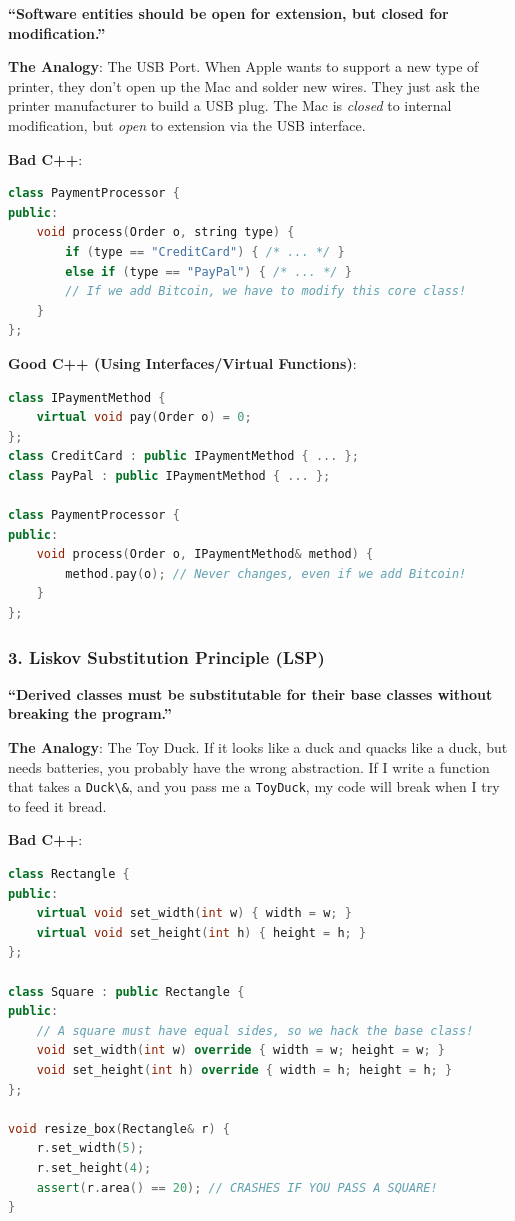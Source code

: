 \textbf{``Software entities should be open for extension, but closed for
modification.''}

\textbf{The Analogy}: The USB Port. When Apple wants to support a new
type of printer, they don't open up the Mac and solder new wires. They
just ask the printer manufacturer to build a USB plug. The Mac is
\emph{closed} to internal modification, but \emph{open} to extension via
the USB interface.

\textbf{Bad C++}:

\begin{lstlisting}[language={C++}]
class PaymentProcessor {
public:
    void process(Order o, string type) {
        if (type == "CreditCard") { /* ... */ }
        else if (type == "PayPal") { /* ... */ }
        // If we add Bitcoin, we have to modify this core class!
    }
};
\end{lstlisting}

\textbf{Good C++ (Using Interfaces/Virtual Functions)}:

\begin{lstlisting}[language={C++}]
class IPaymentMethod {
    virtual void pay(Order o) = 0;
};
class CreditCard : public IPaymentMethod { ... };
class PayPal : public IPaymentMethod { ... };

class PaymentProcessor {
public:
    void process(Order o, IPaymentMethod& method) {
        method.pay(o); // Never changes, even if we add Bitcoin!
    }
};
\end{lstlisting}

\hypertarget{liskov-substitution-principle-lsp}{%
\subsubsection{3. Liskov Substitution Principle
(LSP)}\label{liskov-substitution-principle-lsp}}

\textbf{``Derived classes must be substitutable for their base classes
without breaking the program.''}

\textbf{The Analogy}: The Toy Duck. If it looks like a duck and quacks
like a duck, but needs batteries, you probably have the wrong
abstraction. If I write a function that takes a
\passthrough{\lstinline!Duck\&!}, and you pass me a
\passthrough{\lstinline!ToyDuck!}, my code will break when I try to feed
it bread.

\textbf{Bad C++}:

\begin{lstlisting}[language={C++}]
class Rectangle {
public:
    virtual void set_width(int w) { width = w; }
    virtual void set_height(int h) { height = h; }
};

class Square : public Rectangle {
public:
    // A square must have equal sides, so we hack the base class!
    void set_width(int w) override { width = w; height = w; }
    void set_height(int h) override { width = h; height = h; }
};

void resize_box(Rectangle& r) {
    r.set_width(5);
    r.set_height(4);
    assert(r.area() == 20); // CRASHES IF YOU PASS A SQUARE!
}
\end{lstlisting}


